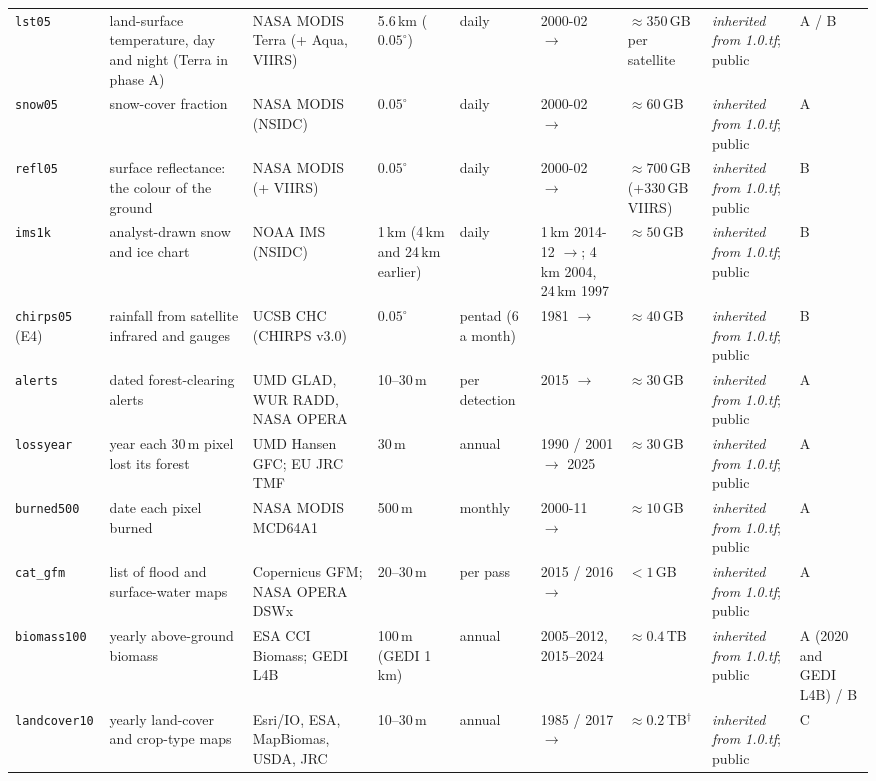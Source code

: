 \documentclass[10pt]{article}
\newcommand{\code}[1]{\texttt{#1}}
\begin{document}
{\begin{longtable}{@{}L{1.65cm}L{2.6cm}L{2.0cm}L{1.7cm}L{1.75cm}L{1.85cm}L{2.5cm}L{2.1cm}L{0.5cm}@{}}
\code{lst05} & land-surface temperature, day and night (Terra in phase A) & NASA MODIS Terra (+ Aqua, VIIRS) & 5.6\,km ($0.05^\circ$) & daily & 2000-02 $\to$ & $\approx 350$\,GB per satellite & \emph{inherited from 1.0.tf}; public & A / B \\
\code{snow05} & snow-cover fraction & NASA MODIS (NSIDC) & $0.05^\circ$ & daily & 2000-02 $\to$ & $\approx 60$\,GB & \emph{inherited from 1.0.tf}; public & A \\
\code{refl05} & surface reflectance: the colour of the ground & NASA MODIS (+ VIIRS) & $0.05^\circ$ & daily & 2000-02 $\to$ & $\approx 700$\,GB (+330\,GB VIIRS) & \emph{inherited from 1.0.tf}; public & B \\
\code{ims1k} & analyst-drawn snow and ice chart & NOAA IMS (NSIDC) & 1\,km (4\,km and 24\,km earlier) & daily & 1\,km 2014-12 $\to$; 4\,km 2004, 24\,km 1997 & $\approx 50$\,GB & \emph{inherited from 1.0.tf}; public & B \\
\code{chirps05} (E4) & rainfall from satellite infrared and gauges & UCSB CHC (CHIRPS v3.0) & $0.05^\circ$ & pentad (6 a month) & 1981 $\to$ & $\approx 40$\,GB & \emph{inherited from 1.0.tf}; public & B \\
\code{alerts} & dated forest-clearing alerts & UMD GLAD, WUR RADD, NASA OPERA & 10--30\,m & per detection & 2015 $\to$ & $\approx 30$\,GB & \emph{inherited from 1.0.tf}; public & A \\
\code{lossyear} & year each 30\,m pixel lost its forest & UMD Hansen GFC; EU JRC TMF & 30\,m & annual & 1990 / 2001 $\to$ 2025 & $\approx 30$\,GB & \emph{inherited from 1.0.tf}; public & A \\
\code{burned500} & date each pixel burned & NASA MODIS MCD64A1 & 500\,m & monthly & 2000-11 $\to$ & $\approx 10$\,GB & \emph{inherited from 1.0.tf}; public & A \\
\code{cat\_gfm} & list of flood and surface-water maps & Copernicus GFM; NASA OPERA DSWx & 20--30\,m & per pass & 2015 / 2016 $\to$ & $<1$\,GB & \emph{inherited from 1.0.tf}; public & A \\
\code{biomass100} & yearly above-ground biomass & ESA CCI Biomass; GEDI L4B & 100\,m (GEDI 1\,km) & annual & 2005--2012, 2015--2024 & $\approx 0.4$\,TB & \emph{inherited from 1.0.tf}; public & A (2020 and GEDI L4B) / B \\
\code{landcover10} & yearly land-cover and crop-type maps & Esri/IO, ESA, MapBiomas, USDA, JRC & 10--30\,m & annual & 1985 / 2017 $\to$ & $\approx 0.2$\,TB$^\dagger$ & \emph{inherited from 1.0.tf}; public & C \\

\end{longtable}}
\end{document}
